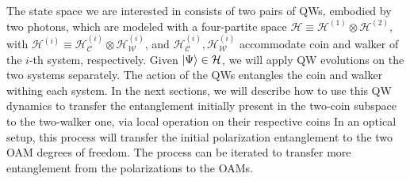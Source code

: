 \documentclass[
	aps, pra,
	superscriptaddress, twocolumn,
	floatfix,
	10pt
]{revtex4-1}
\newcommand{\parTitle}[1]{\noindent{\color{Mahogany}(\emph{#1})}}
\newcommand{\calC}{{\mathcal{C}}}
\newcommand{\calH}{{\mathcal{H}}}
\newcommand{\calU}{{\mathcal{U}}}
\newcommand{\calV}{{\mathcal{V}}}
\newcommand{\calW}{{\mathcal{W}}}
\newcommand{\HC}{\calH_\calC}
\newcommand{\HW}{\calH_\calW}
\renewcommand{\parTitle}[1]{}
\begin{document}

\parTitle{Pairs of QWs}
The state space we are interested in consists of two pairs of QWs, embodied by two photons, which are modeled with a four-partite space $\calH\equiv \calH^{(1)}\otimes\calH^{(2)}$, with
$\calH^{(i)}\equiv \HC^{(i)}\otimes\HW^{(i)}$,
and $\HC^{(i)}, \HW^{(i)}$ accommodate coin and walker of the $i$-th system, respectively.
Given $\ket\Psi\in\calH$, we will apply QW evolutions on the two systems separately.
The action of the QWs entangles the coin and walker withing each system.
In the next sections, we will describe how to use this QW dynamics to transfer the entanglement initially present in the two-coin subspace to the two-walker one, via local operation on their respective coins
In an optical setup, this process will transfer the initial polarization entanglement to the two OAM degrees of freedom. The process can be iterated to transfer more entanglement from the polarizations to the OAMs.
\end{document}
